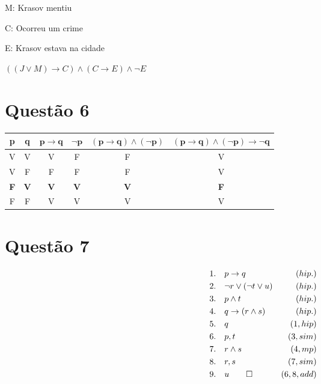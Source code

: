 \documentclass{article}
\begin{document}
M: Krasov mentiu

C: Ocorreu um crime

E: Krasov estava na cidade

\medskip
$((J\vee M) \rightarrow C) \wedge (C \rightarrow E) \wedge \neg E$

\section*{Questão 6}

\begingroup
\renewcommand{\arraystretch}{1.75}
\begin{table}[h!]
    \centering
    \begin{tabular}{||c|c|c|c|c|c||}
        \hline
        \textbf{p} & \textbf{q} & $\mathbf{p \rightarrow q}$ & $\mathbf{\neg p}$ & $\mathbf{(p \rightarrow q) \wedge (\neg p)}$ & $\mathbf{(p \rightarrow q) \wedge (\neg p) \rightarrow \neg q}$\\
        \hline
        \hline
        V & V & V & F & F & V \\ \hline
        V & F & F & F & F & V \\ \hline
        \textbf{F} & \textbf{V} & \textbf{V} & \textbf{V} & \textbf{V} & \textbf{F} \\ \hline
        F & F & V & V & V & V \\ \hline
    \end{tabular}
\end{table}
\endgroup

\section*{Questão 7}

\begin{align*}
    1. \hspace{10pt} & p \rightarrow q & (hip.) \\
    2. \hspace{10pt} & \neg r \vee (\neg t \vee u) & (hip.) \\
    3. \hspace{10pt} & p \wedge t & (hip.) \\
    4. \hspace{10pt} & q \rightarrow (r \wedge s) & (hip.) \\
    5. \hspace{10pt} & q & (1, hip) \\
    6. \hspace{10pt} & p, t & (3, sim) \\
    7. \hspace{10pt} & r \wedge s & (4, mp) \\
    8. \hspace{10pt} & r, s & (7, sim) \\
    9. \hspace{10pt} & u \qed & (6, 8, add)
\end{align*}
\end{document}
